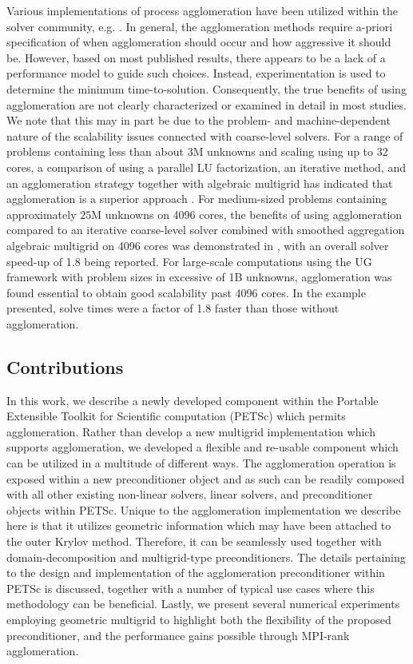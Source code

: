 \documentclass[]{siamart0216}
\begin{document}
Various implementations of process agglomeration have been utilized within the solver 
community, e.g. \cite{blatt2012massively, emans2011coarse, may2015scalable, muller2014massively, reiter2013massively, rudi2015extreme}. 
In general, the agglomeration methods require a-priori specification of when agglomeration should occur 
and how aggressive it should be. However, based on most published results, there appears to be a lack of a performance 
model to guide such choices. Instead, experimentation is used to determine the minimum time-to-solution.
Consequently, the true benefits of using agglomeration are not clearly characterized or examined in detail in most studies. 
We note that this may in part be due to the problem- and machine-dependent nature of the scalability issues 
connected with coarse-level solvers.
For a range of problems containing less than about $3$M unknowns and scaling using up to 32 cores, a comparison of using a parallel LU factorization, an iterative method, and an agglomeration strategy together with algebraic multigrid has indicated that 
agglomeration is a superior approach \cite{emans2011coarse}. 
For medium-sized problems containing approximately $25$M unknowns on 4096 cores, the benefits of using agglomeration compared to an iterative 
coarse-level solver combined with smoothed aggregation algebraic multigrid on 4096 cores was demonstrated in \cite{may2015scalable}, 
with an overall solver speed-up of 1.8 being reported. 
For large-scale computations using the UG framework \cite{reiter2013massively} with problem sizes in excessive of 1B unknowns,  agglomeration was found essential to obtain good scalability past 4096 cores. In the example presented, solve 
times were a factor of 1.8 faster than those without agglomeration.

\subsection{Contributions}
In this work, we describe a newly developed component within the Portable Extensible Toolkit for 
Scientific computation (PETSc) \cite{petsc-user-ref,petsc-web-page,petsc-efficient} which permits agglomeration. 
Rather than develop a new multigrid implementation which supports agglomeration, we 
developed a flexible and re-usable component which can be utilized in a multitude of different ways.
The agglomeration operation is exposed within a new preconditioner object and as such can be readily composed with 
all other existing non-linear solvers, linear solvers, and preconditioner objects within PETSc. 
Unique to the agglomeration implementation we describe here is that it utilizes geometric information which 
may have been attached to the outer Krylov method. Therefore, it can be seamlessly used together with domain-decomposition 
and multigrid-type preconditioners.
The details pertaining to the design and implementation of the agglomeration preconditioner within PETSc is discussed, 
together with a number of typical use cases where this methodology can be beneficial. 
Lastly, we present several numerical experiments employing geometric multigrid to highlight both the flexibility of the proposed 
preconditioner, and the performance gains possible through MPI-rank agglomeration.
\end{document}
